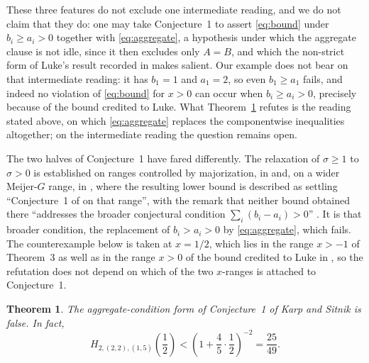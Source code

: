 \documentclass[11pt]{amsart}
\newtheorem{theorem}{Theorem}
\begin{document}
These three features do not exclude one intermediate reading, and we do not
claim that they do: one may take Conjecture~1 to assert \eqref{eq:bound}
under $b_i\ge a_i>0$ together with \eqref{eq:aggregate}, a hypothesis under
which the aggregate clause is not idle, since it then excludes only $A=B$,
and which the non-strict form of Luke's result recorded in \cite{KS} makes
salient. Our example does not bear on that intermediate reading: it has
$b_1=1$ and $a_1=2$, so even $b_1\ge a_1$ fails, and indeed no violation of
\eqref{eq:bound} for $x>0$ can occur when $b_i\ge a_i>0$, precisely because
of the bound credited to Luke. What Theorem~\ref{thm:counterexample}
refutes is the reading stated above, on which \eqref{eq:aggregate} replaces
the componentwise inequalities altogether; on the intermediate reading the
question remains open.

The two halves of Conjecture~1 have fared differently. The relaxation of
$\sigma\ge1$ to $\sigma>0$ is established on ranges controlled by
majorization, in \cite[Theorem~5]{KP} and, on a wider Meijer-$G$ range, in
\cite{Derbazi}, where the resulting lower bound is described as settling
``Conjecture~1 of \cite{KS} on that range'', with the remark that neither
bound obtained there ``addresses the broader conjectural condition
$\sum_i(b_i-a_i)>0$'' \cite[discussion following
Proposition~3.3]{Derbazi}. It is that broader condition, the replacement of
$b_i>a_i>0$ by \eqref{eq:aggregate}, which fails. The counterexample below
is taken at $x=1/2$, which lies in the range $x>-1$ of Theorem~3 as well as
in the range $x>0$ of the bound credited to Luke in \cite{KS}, so the
refutation does not depend on which of the two $x$-ranges is attached to
Conjecture~1.

\begin{theorem}\label{thm:counterexample}
The aggregate-condition form of Conjecture~1 of Karp and Sitnik is false.
In fact,
\[
 H_{2,(2,2),(1,5)}\!\left(\frac12\right)
 <
 \left(1+\frac45\cdot\frac12\right)^{-2}
 =\frac{25}{49}.
\]
\end{theorem}
\end{document}
